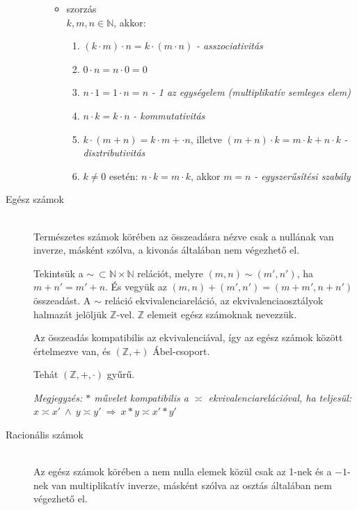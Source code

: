 \documentclass[margin=0px]{article}
\newcommand{\N}{\mathbb{N}}
\newcommand{\Z}{\mathbb{Z}}
\begin{document}
\begin{description}
\begin{itemize}
\begin{itemize}
\begin{enumerate}
										\end{enumerate}
									\item szorzás \\
										$k,m,n \in \N$, akkor:
										\begin{enumerate}
											\item $(k\cdot m)\cdot n = k\cdot (m\cdot n)$ \textit{- asszociativitás}
											\item $ 0\cdot n = n\cdot 0 = 0$
											\item $n\cdot 1 = 1\cdot n = n$ \textit{- 1 az egységelem (multiplikatív semleges elem)}
											\item $n\cdot k = k\cdot n$ \textit{- kommutativitás}
											\item $k\cdot (m+n) = k\cdot m + \cdot n$, illetve $(m+n) \cdot k = m\cdot k+n\cdot k$ \textit{- disztributivitás}
											\item $k\neq 0$ esetén: $n\cdot k = m\cdot k$, akkor $m=n$ \textit{- egyszerűsítési szabály}
										\end{enumerate}
								\end{itemize}
						\end{itemize}
					\item[Egész számok] \hfill \\
						Természetes számok körében az összeadásra nézve csak a nullának van inverze, másként szólva, a kivonás általában nem végezhető el. 
						
						Tekintsük a $\sim\ \subset\N\times\N$ relációt, melyre $(m,n) \sim (m',n')$, ha $m+n' = m'+n$. És vegyük az $(m,n)+(m',n') = (m+m',n+n')$ összeadást. A $\sim$ reláció ekvivalenciareláció, az ekvivalenciaosztályok halmazát jelöljük $\Z$-vel. $\Z$ elemeit egész számoknak nevezzük.
						
						Az összeadás kompatibilis az ekvivalenciával, így az egész számok között értelmezve van, és $(\Z, +)$ Ábel-csoport.
						
						Tehát $(\Z, +, \cdot)$ gyűrű.
						
						\textit{Megjegyzés: $*$ művelet kompatibilis a $\asymp$ ekvivalenciarelációval, ha teljesül: $ x \asymp x' \ \land \ y \asymp y' \ \Longrightarrow \ x * y \asymp x'*y'$}
					\item[Racionális számok] \hfill \\
						Az egész számok körében a nem nulla elemek közül csak az 1-nek és a $-1$-nek van multiplikatív inverze, másként szólva az osztás általában nem végezhető el.
						

\end{description}
\end{document}
